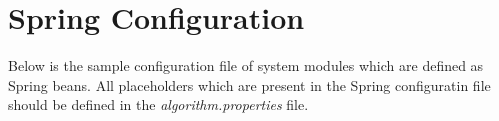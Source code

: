 \chapter{Spring Configuration}
\label{ch:SpringConfiguration}

Below is the sample configuration file of system modules
which are defined as Spring beans. All placeholders which
are present in the Spring configuratin file should be defined
in the \textit{algorithm.properties} file.

